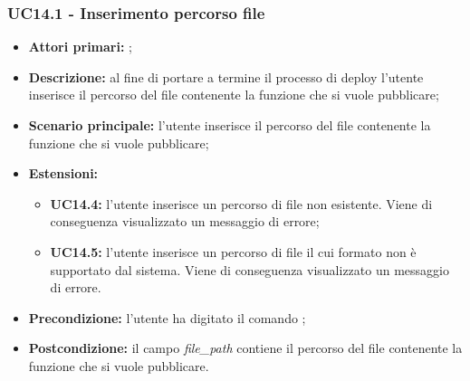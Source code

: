 \subsubsection{UC14.1 - Inserimento percorso file}
\begin{itemize}
	\item \textbf{Attori primari:} \us{};
	\item \textbf{Descrizione:} al fine di portare a termine il processo di deploy l’utente inserisce il percorso del file contenente la funzione che si vuole pubblicare;  
	\item \textbf{Scenario principale:} l'utente inserisce il percorso del file contenente la funzione che si vuole pubblicare; 
	\item \textbf{Estensioni:} 
	\begin{itemize}
		\item \textbf{UC14.4:} l’utente inserisce un percorso di file non esistente. Viene di conseguenza visualizzato un messaggio di errore;
		\item \textbf{UC14.5:} l’utente inserisce un percorso di file il cui formato non è supportato dal sistema. Viene di conseguenza visualizzato un messaggio di errore. 
	\end{itemize}
	\item \textbf{Precondizione:} l’utente ha digitato il comando \deploy{}; 
	\item \textbf{Postcondizione:} il campo \textit{file\_path} contiene il percorso del file contenente la funzione che si vuole pubblicare. 
\end{itemize}